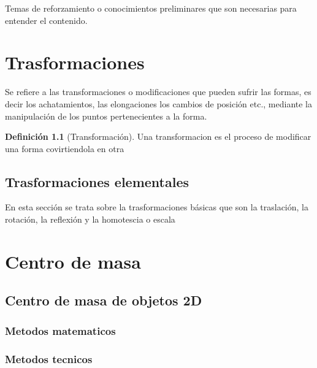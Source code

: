 \documentclass[
  16pt,
]{krantz}
\theoremstyle{definition}
\newtheorem{definition}{Definición}[chapter]
\theoremstyle{definition}
\theoremstyle{definition}
\theoremstyle{definition}
\theoremstyle{remark}
\begin{document}
\hypertarget{appendix-apendice}{%
\appendix {}}


Temas de reforzamiento o conocimientos preliminares que son necesarias para entender el contenido.

\hypertarget{trasformaciones}{%
\chapter{Trasformaciones}\label{trasformaciones}}

Se refiere a las transformaciones o modificaciones que pueden sufrir las formas, es decir los achatamientos, las elongaciones los cambios de posición etc., mediante la manipulación de los puntos pertenecientes a la forma.

\begin{definition}[Transformación]
\protect\hypertarget{def:transformacion}{}{\label{def:transformacion} {} }Una transformacion es el proceso de modificar una forma covirtiendola en otra
\end{definition}

\hypertarget{trasformaciones-elementales}{%
\section{Trasformaciones elementales}\label{trasformaciones-elementales}}

En esta sección se trata sobre la trasformaciones básicas que son la traslación, la rotación, la reflexión y la homotescia o escala

\hypertarget{centro-de-masa}{%
\chapter{Centro de masa}\label{centro-de-masa}}

\hypertarget{centro-de-masa-de-objetos-2d}{%
\section{Centro de masa de objetos 2D}\label{centro-de-masa-de-objetos-2d}}

\hypertarget{metodos-matematicos}{%
\subsection{Metodos matematicos}\label{metodos-matematicos}}

\hypertarget{metodos-tecnicos}{%
\subsection{Metodos tecnicos}\label{metodos-tecnicos}}
\end{document}
